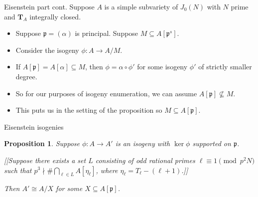 \documentclass{beamer}
\newtheorem{proposition}[theorem]{Proposition}
\newcommand{\TT}{\mathbf{T}}
\newcommand{\p}{\mathfrak{p}}
\begin{document}
\begin{frame}{Eisenstein part cont.}
    Suppose $A$ is a simple subvariety of $J_0(N)$ with $N$ prime and $\TT_A$
    integrally closed.
            \pause
    \begin{itemize}
        \item 
            Suppose $\p=(\alpha)$ is principal. Suppose $M\subseteq A[\p^s]$.
            \pause
        \item
            Consider the isogeny $\phi:A\to A/M$.
            \pause
        \item
            If $A[\p]=A[\alpha]\subseteq M$, then $\phi=\alpha\circ \phi'$ for
            some isogeny $\phi'$ of strictly smaller degree.
            \pause
        \item
            So for our purposes of isogeny enumeration, we can assume
            $A[\p]\not\subseteq M$.
            \pause
        \item
            This puts us in the setting of the proposition so $M\subseteq
            A[\p]$.
    \end{itemize}
\end{frame}

\begin{frame}{Eisenstein isogenies}
    \begin{proposition}
        Suppose $\phi:A\to A'$ is an isogeny with $\ker\phi$ supported on $\p$.

        [[Suppose there exists a set $L$ consisting of odd rational primes
        $\ell\equiv 1 \pmod{p^2 N}$ such that $p^3\nmid \#\bigcap_{\ell\in L}
        A[\eta_\ell]$, where $\eta_\ell=T_\ell-(\ell+1)$.]]

        Then $A'\cong A/X$ for some $X\subseteq A[\p]$.
    \end{proposition}
\end{frame}
\end{document}
